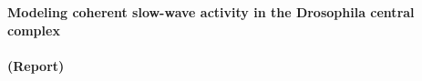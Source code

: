 \documentclass[../../report.tex]{subfiles}
\begin{document}
    \thispagestyle{empty}
    \begin{center}
        \vspace*{7cm}
            
        \textbf{\huge Modeling coherent slow-wave activity in the Drosophila central complex \\\phantom{}}\\[1 cm]

        \textbf{\huge (Report)}
    \end{center}
\end{document}
